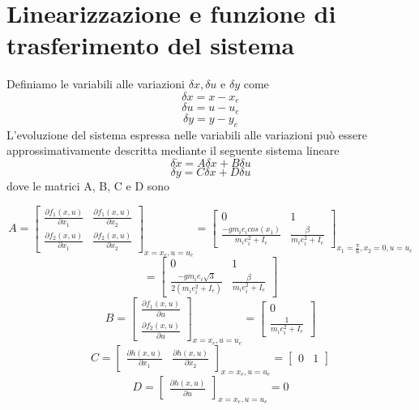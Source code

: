 \documentclass{article}
\begin{document}
\section{Linearizzazione e funzione di trasferimento del sistema}
Definiamo le variabili alle variazioni $\delta x, \delta u $  e $\delta y $ come 
$$
\delta x = x - x_e
$$
$$
\delta u = u - u_e 
$$
$$
\delta y = y - y_e
$$
L'evoluzione del sistema espressa nelle variabili alle variazioni può essere approssimativamente descritta mediante il seguente sistema lineare
$$
\delta \dot x = A \delta x + B \delta u
$$
$$
\delta y = C \delta x + D \delta u
$$
dove le matrici A, B, C e D sono

$$
A = \left[\begin{matrix} \frac{\partial f_1(x,u)}{\partial x_1} & \frac{\partial f_1(x,u)}{\partial x_2} \\ \frac{\partial f_2(x,u)}{\partial x_1} & \frac{\partial f_2(x,u)}{\partial x_2}\end{matrix}\right]_{x=x_e,  u=u_e}
= \left[\begin{matrix} 0 & 1 \\ \frac{-g m_i e_i cos(x_1)}{m_i e_i^2 + I_e} & \frac{\beta}{m_i e_i^2 + I_e} \end{matrix}\right]_{x_1=\frac{\pi}{6}, x_2=0,  u=u_e}
$$
$$
= \left[\begin{matrix} 0 & 1 \\ \frac{-g m_i e_i \sqrt{3}}{2(m_i e_i^2 + I_e)} & \frac{\beta}{m_i e_i^2 + I_e} \end{matrix}\right]
$$
$$
B = \left[\begin{matrix} \frac{\partial f_1(x,u)}{\partial u}\\ \frac{\partial f_2(x,u)}{\partial u} \end{matrix}\right]_{x=x_e, u=u_e}
= \left[\begin{matrix} 0 \\ \frac{1}{m_i e_i^2 + I_e} \end{matrix}\right]
$$
$$
C = \left[\begin{matrix} \frac{\partial h(x,u)}{\partial x_1} & \frac{\partial h(x,u)}{\partial x_2} \end{matrix}\right]_{x=x_e, u=u_e}
=\left[\begin{matrix} 0 & 1 \end{matrix}\right]
$$
$$
D = \left[\begin{matrix} \frac{\partial h(x,u)}{\partial u} \end{matrix}\right]_{x=x_e, u=u_e}
= 0
$$
\end{document}
